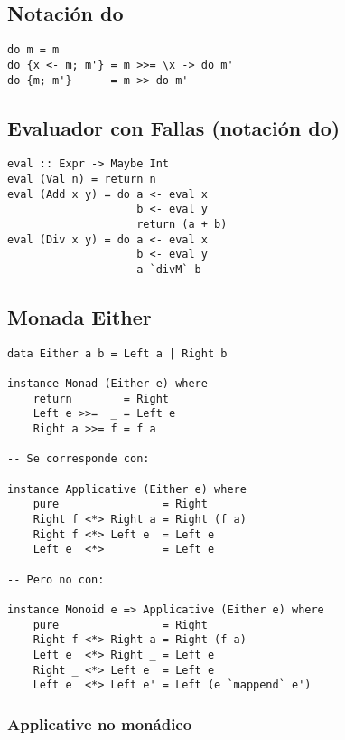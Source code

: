 \documentclass{article}
\begin{document}
\subsection{Notación do}


\begin{lstlisting}
do m = m
do {x <- m; m'} = m >>= \x -> do m'
do {m; m'}      = m >> do m'
\end{lstlisting}

\subsection{Evaluador con Fallas (notación do)}

\begin{lstlisting}
eval :: Expr -> Maybe Int
eval (Val n) = return n
eval (Add x y) = do a <- eval x
                    b <- eval y
                    return (a + b)
eval (Div x y) = do a <- eval x
                    b <- eval y
                    a `divM` b
\end{lstlisting}

\newpage

\subsection{Monada Either}

\begin{lstlisting}
data Either a b = Left a | Right b

instance Monad (Either e) where
    return        = Right
    Left e >>=  _ = Left e
    Right a >>= f = f a

-- Se corresponde con:

instance Applicative (Either e) where
    pure                = Right
    Right f <*> Right a = Right (f a)
    Right f <*> Left e  = Left e
    Left e  <*> _       = Left e

-- Pero no con:

instance Monoid e => Applicative (Either e) where
    pure                = Right
    Right f <*> Right a = Right (f a)
    Left e  <*> Right _ = Left e
    Right _ <*> Left e  = Left e
    Left e  <*> Left e' = Left (e `mappend` e')

\end{lstlisting}

\subsubsection{Applicative no monádico}
\end{document}
